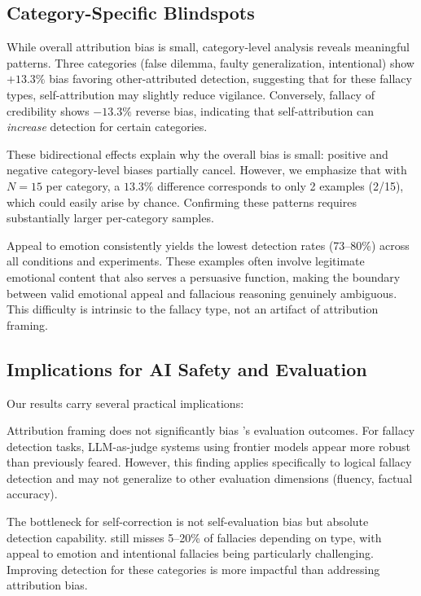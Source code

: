 \subsection{Category-Specific Blindspots}

While overall attribution bias is small, category-level analysis reveals meaningful patterns. Three categories (false dilemma, faulty generalization, intentional) show $+13.3\%$ bias favoring other-attributed detection, suggesting that for these fallacy types, self-attribution may slightly reduce vigilance. Conversely, fallacy of credibility shows $-13.3\%$ reverse bias, indicating that self-attribution can \emph{increase} detection for certain categories.

These bidirectional effects explain why the overall bias is small: positive and negative category-level biases partially cancel. However, we emphasize that with $N = 15$ per category, a $13.3\%$ difference corresponds to only 2 examples (2/15), which could easily arise by chance. Confirming these patterns requires substantially larger per-category samples.

Appeal to emotion consistently yields the lowest detection rates (73--80\%) across all conditions and experiments. These examples often involve legitimate emotional content that also serves a persuasive function, making the boundary between valid emotional appeal and fallacious reasoning genuinely ambiguous. This difficulty is intrinsic to the fallacy type, not an artifact of attribution framing.

\subsection{Implications for AI Safety and Evaluation}

Our results carry several practical implications:

 Attribution framing does not significantly bias \gptfull's evaluation outcomes. For fallacy detection tasks, LLM-as-judge systems using frontier models appear more robust than previously feared. However, this finding applies specifically to logical fallacy detection and may not generalize to other evaluation dimensions (\eg fluency, factual accuracy).

 The bottleneck for self-correction is not self-evaluation bias but absolute detection capability. \gptfull still misses 5--20\% of fallacies depending on type, with appeal to emotion and intentional fallacies being particularly challenging. Improving detection for these categories is more impactful than addressing attribution bias.


